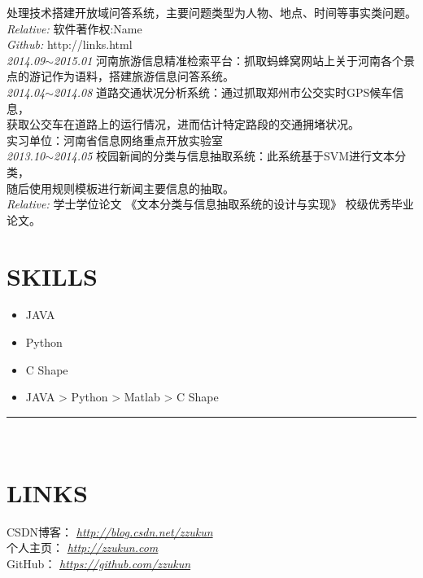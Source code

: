 \documentclass[line, margin]{res}
\newcommand{\xiaowu}{\fontsize{9pt}{15.75pt}\selectfont} %
\begin{document}
\begin{resume}
{{ 处理技术搭建开放域问答系统，主要问题类型为人物、地点、时间等事实类问题。}\\ 
 {\sl Relative:} {\xiaowu 软件著作权:Name} \\
 {\sl Github:} {\xiaowu http://links.html} \\
[7pt]
 {\sl 2014.09$\sim$2015.01} 河南旅游信息精准检索平台：{ 抓取蚂蜂窝网站上关于河南各个景\\
 点的游记作为语料，搭建旅游信息问答系统。} \\
[7pt]
 {\sl 2014.04$\sim$2014.08} 道路交通状况分析系统：{ 通过抓取郑州市公交实时GPS候车信息，\\
 获取公交车在道路上的运行情况，进而估计特定路段的交通拥堵状况。 \\
 实习单位：河南省信息网络重点开放实验室} \\
[7pt]
 {\sl 2013.10$\sim$2014.05} 校园新闻的分类与信息抽取系统：{ 此系统基于SVM进行文本分类，\\
 随后使用规则模板进行新闻主要信息的抽取。}\\
   {\sl Relative:} {\xiaowu 学士学位论文 《文本分类与信息抽取系统的设计与实现》 校级优秀毕业论文。}} \\
 
\section{SKILLS}
\begin{itemize}
\item JAVA
\item Python
\item C Shape
\item JAVA > Python > Matlab > C Shape
\end{itemize}

\rule{13.0cm}{0.05em} \\


\vspace {30pt}
\section {LINKS}
{ CSDN博客：} {\sl \url{http://blog.csdn.net/zzukun}}\\
[3pt]
{ 个人主页：} {\sl \url{http://zzukun.com}}\\
[3pt]
{ GitHub：  } {\sl \url{https://github.com/zzukun}}\\

\end{resume}
\end{document}
